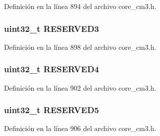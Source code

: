 Definición en la línea 894 del archivo core\+\_\+cm3.\+h.

\subsubsection[{\texorpdfstring{R\+E\+S\+E\+R\+V\+E\+D3}{RESERVED3}}]{\setlength{\rightskip}{0pt plus 5cm}uint32\+\_\+t R\+E\+S\+E\+R\+V\+E\+D3}\hypertarget{struct_t_p_i___type_a12053bc8429f36ac5045e18bc436ef82}{}\label{struct_t_p_i___type_a12053bc8429f36ac5045e18bc436ef82}


Definición en la línea 898 del archivo core\+\_\+cm3.\+h.

\subsubsection[{\texorpdfstring{R\+E\+S\+E\+R\+V\+E\+D4}{RESERVED4}}]{\setlength{\rightskip}{0pt plus 5cm}uint32\+\_\+t R\+E\+S\+E\+R\+V\+E\+D4}\hypertarget{struct_t_p_i___type_a2280438c0b38d74e14edd06c4569d419}{}\label{struct_t_p_i___type_a2280438c0b38d74e14edd06c4569d419}


Definición en la línea 902 del archivo core\+\_\+cm3.\+h.

\subsubsection[{\texorpdfstring{R\+E\+S\+E\+R\+V\+E\+D5}{RESERVED5}}]{\setlength{\rightskip}{0pt plus 5cm}uint32\+\_\+t R\+E\+S\+E\+R\+V\+E\+D5}\hypertarget{struct_t_p_i___type_a4cf403d6d314453bf19d2b73be98367a}{}\label{struct_t_p_i___type_a4cf403d6d314453bf19d2b73be98367a}


Definición en la línea 906 del archivo core\+\_\+cm3.\+h.

